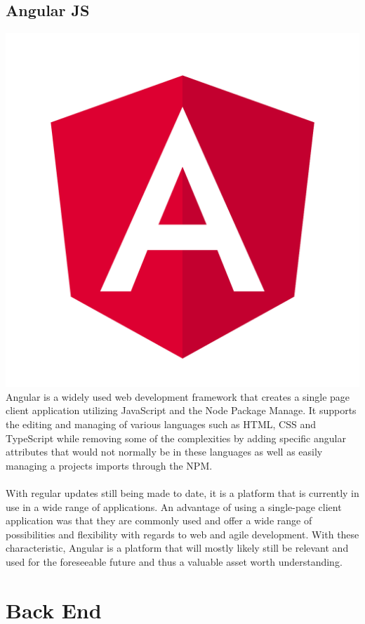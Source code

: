 \subsection{Angular JS}
\includegraphics[scale=0.025]{./img/Angular.PNG}
Angular is a widely used web development framework that creates a single page client application utilizing JavaScript and the Node Package Manage. It supports the editing and managing of various languages such as HTML, CSS and TypeScript while removing some of the complexities by adding specific angular attributes that would not normally be in these languages as well as easily managing a projects imports through the NPM.
\\\\
With regular updates still being made to date, it is a platform that is currently in use in a wide range of applications. An advantage of using a single-page client application was that they are commonly used and offer a wide range of possibilities and flexibility with regards to web and agile development.  With these characteristic, Angular is a platform that will mostly likely still be relevant and used for the foreseeable future and thus a valuable asset worth understanding.

\section{Back End}
